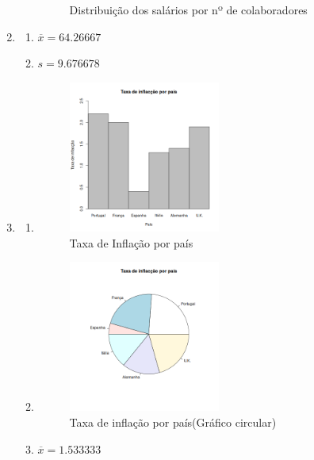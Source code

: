 \documentclass[11pt,a4paper]{report}
\begin{document}
\begin{enumerate}[label=\arabic{chapter}.\arabic*]
\begin{enumerate}[label=\alph*)]
\begin{figure}[h!]
				\caption{Distribuição dos salários por nº de colaboradores}
			\end{figure}
		\end{enumerate}
	\clearpage
	\item{}\hfill
		
		\begin{enumerate}[label=\alph*)]
		\item$\overline{x} = 64.26667$
		\item$s = 9.676678$
		\end{enumerate}
	\clearpage
	\item{}\hfill
		
		\begin{enumerate}[label=\alph*)]
		\item\hfill
			\begin{figure}[h!]
				\centering
				\includegraphics[width=0.5\textwidth]{imagem/ieedr/ex4_4a.png}
				\caption{Taxa de Inflação por país}
			\end{figure}
	\clearpage
		\item\hfill
			\begin{figure}[h!]
				\centering
				\includegraphics[width=0.5\textwidth]{imagem/ieedr/ex4_4b.png}
				\caption{Taxa de inflação por país(Gráfico
				circular)}
			\end{figure}
		\item$\overline{x} = 1.533333$
		\end{enumerate}
\end{enumerate}
\end{document}
